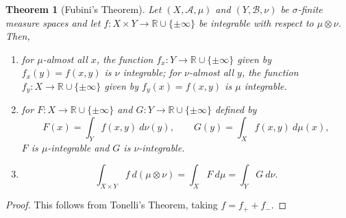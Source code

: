 \documentclass[a4paper, openany]{memoir}
\theoremstyle{definition}
\theoremstyle{plain}
\newtheorem{theorem}[definition]{Theorem}
\begin{document}
    \begin{theorem}[Fubini's Theorem]
        Let $(X, \mathcal{A}, \mu)$ and $(Y, \mathcal{B}, \nu)$ be $\sigma$-finite measure spaces and let $f \colon X \times Y \to \mathbb{R} \cup \{\pm \infty\}$ be integrable with respect to $\mu \otimes \nu$. Then,
        \begin{enumerate}
            \item for $\mu$-almost all $x$, the function $f_x \colon Y \to \mathbb{R} \cup \{\pm \infty\}$ given by $f_x(y) = f(x, y)$ is $\nu$ integrable; for $\nu$-almost all $y$, the function $f_y \colon X \to \mathbb{R} \cup \{\pm \infty\}$ given by $f_y(x) = f(x, y)$ is $\mu$ integrable.
            \item for $F \colon X \to \mathbb{R} \cup \{\pm \infty\}$ and $G \colon Y \to \mathbb{R} \cup \{\pm \infty\}$ defined by
            \[F(x) = \int_Y f(x, y) \ d\nu(y), \qquad G(y) = \int_X f(x, y) \ d\mu(x),\]
            $F$ is $\mu$-integrable and $G$ is $\nu$-integrable.
            \item \[\int_{X \times Y} f \ d(\mu \otimes \nu) = \int_X F \ d\mu = \int_Y G \ d\nu.\]
        \end{enumerate}
    \end{theorem}
    \begin{proof}
        This follows from Tonelli's Theorem, taking $f = f_+ + f_-$.
    \end{proof}
\end{document}
